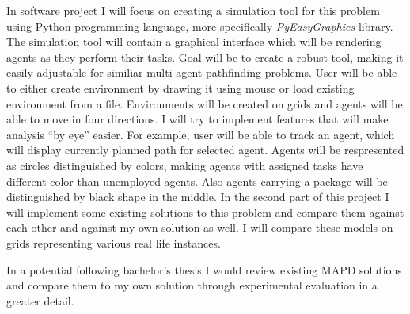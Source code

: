 \vspace{5mm}\noindent
In software project I will focus on creating a simulation tool for this problem
using Python programming language, more specifically \textit{PyEasyGraphics}
library.
The simulation tool will contain a graphical interface which will be rendering 
agents as they perform their tasks. Goal will be to create a robust tool, making
it easily adjustable for similiar multi-agent pathfinding problems. User will be
able to either create environment by drawing it using mouse or load existing
environment from a file. Environments will be created on grids and agents will
be able to move in four directions. I will try to implement features that will
make analysis ``by eye'' easier. For example, user will be able to track an
agent, which will display currently planned path for selected agent. Agents will
be respresented as circles 
distinguished by colors, making agents with assigned tasks have different
color than unemployed agents. Also agents carrying a package will be
distinguished by black shape in the middle.
In the second part of this project I will implement some existing solutions to 
this problem and compare them against each other and against my own solution as well.
I will compare these models on grids representing various real life instances. 


\vspace{5mm}\noindent In a potential following bachelor's thesis I would review
existing MAPD solutions and compare them to my own solution through experimental
evaluation in a greater detail.

